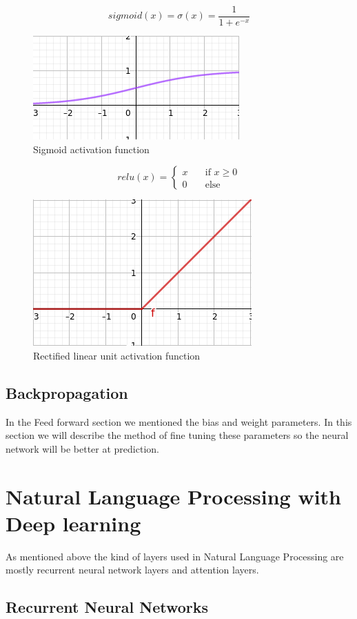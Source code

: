 \[sigmoid(x) = \sigma(x) = \frac{1}{1 + e^{-x}}\]
\begin{figure}[!htb]
	\centering
	\includegraphics[scale=0.5]{sigmoid.jpg}
	\caption{Sigmoid activation function}
	\label{fig:sigmoid}
\end{figure}
\[relu(x) = \begin{cases}x & \quad \text{if } x \geq 0 \\ 0 & \quad \text{else}\end{cases}\]
\begin{figure}[!htb]
	\centering
	\includegraphics[scale=0.5]{relu.jpg}
	\caption{Rectified linear unit activation function}
	\label{fig:relu}
\end{figure}
\subsection{Backpropagation}
In the Feed forward section we mentioned the bias and weight parameters. In this section we will describe the method of fine tuning these parameters so the neural network will be better at prediction.
\section{Natural Language Processing with Deep learning}
As mentioned above the kind of layers used in Natural Language Processing are mostly recurrent neural network layers and attention layers.
\subsection{Recurrent Neural Networks}
